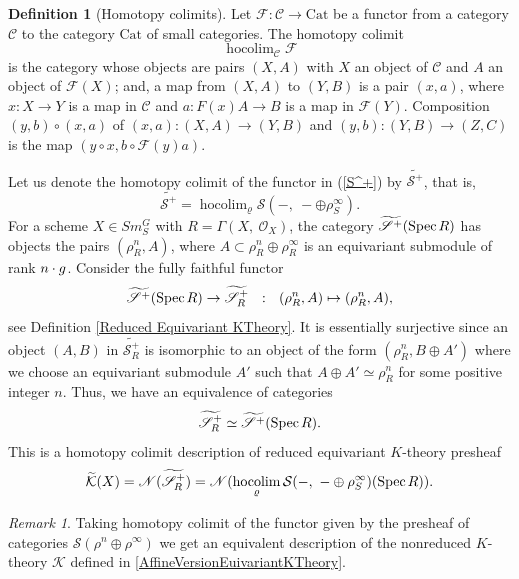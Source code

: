 \documentclass[11pt,twoside]{amsart}
\theoremstyle{definition}
\newtheorem{definition}[theorem]{Definition}
\theoremstyle{remark}
\newtheorem{remark}[theorem]{Remark}
\numberwithin{equation}{section}
\newcommand{\mc}{\mathcal}
\newcommand{\spec}{\mathrm{Spec\hskip .5mm }}
\DeclareMathOperator*{\hocolim}{hocolim}
\begin{document}
\begin{definition}[Homotopy colimits]
\label{dfn:hocolim}
Let $\mc{F}: \mathcal{C}\rightarrow \mathrm{Cat}$ be a functor from a category $\mathcal{C}$ to the category $\mathrm{Cat}$ of small
categories. 
The homotopy colimit 
$$\hocolim_{\mathcal{C}}\mc{F}$$
is the category whose objects are pairs
$(X,A)$ with $X$ an object of $\mathcal{C}$ and $A$ an object of $\mc{F}(X)$; and, a map from $(X,A)$ to $(Y,B)$ is a pair $(x,a)$, where $x:X \rightarrow Y$ is a map in
$\mathcal{C}$ and $a: F(x)A \rightarrow B$ is a map in $\mc{F}(Y)$.
Composition $(y,b)\circ (x,a)$ of $(x,a):(X,A) \rightarrow 
(Y,B)$ and $(y,b):(Y,B) \rightarrow (Z,C)$ is the map $(y\circ x, b\circ \mc{F}(y)a)$.
\end{definition}
Let us denote the homotopy colimit of the functor in (\ref{S^+})
by $\widetilde{\mathscr{S}^+}$, that is,
\begin{equation}
\label{hocolim S^+}\widetilde{\mathscr{S}^+}= \hocolim_{\varrho} \mc{S}(-,\ -\oplus \rho^{\infty}_S).
\end{equation}
For a scheme $X\in Sm^G_S$ with $ R=\Gamma(X,\ \mathcal{O}_X)$, 
the category $\widetilde{\mathscr{S}^+}(\spec R)$ has objects the pairs $(\rho^n_R, A)$, where $A\subset \rho^n_R\oplus\rho^{\infty}_R$ is
an equivariant submodule of rank $n\cdot \textsl{g}$. Consider the fully faithful functor 
$$\widetilde{\mathscr{S}^+}(\spec R) \rightarrow \widetilde{\mathscr{S}_R^+}\ \ : \ \ (\rho^n_R,A)\mapsto (\rho^n_R,A),$$
see Definition \ref{Reduced Equivariant KTheory}. It is essentially surjective
since an object $(A,B)$ in $\widetilde{\mathscr{S}_R^+}$ is isomorphic to an object of the form $(\rho^n_R,B\oplus A')$ where we choose an equivariant submodule $A'$ such that $A\oplus A'\simeq \rho^n_R$ for some positive integer $n$.
Thus, 
we have an equivalence of categories
\begin{equation}
\label{eqn:reduced K-Theory as Grothendieck construction}
\widetilde{\mathscr{S}_R^+} \simeq \widetilde{\mathscr{S}^+}(\spec R).
\end{equation}
This is a homotopy colimit description of reduced equivariant $K$-theory presheaf 
$$\widetilde{\mathcal{K}}(X)= \mathscr{N}(\widetilde{\mathscr{S}_R^+})=
\mathscr{N}(\hocolim_{\varrho} \mc{S}(-,\ -\oplus \rho^{\infty}_S)(\spec R)).$$
\begin{remark}
Taking homotopy colimit of the functor given by the presheaf of  categories $\mc{S}(\rho^n\oplus\rho^\infty)$ we get an equivalent description of the nonreduced $K$-theory $\mc{K}$ defined in \ref{AffineVersionEuivariantKTheory}.
\end{remark}
\end{document}
